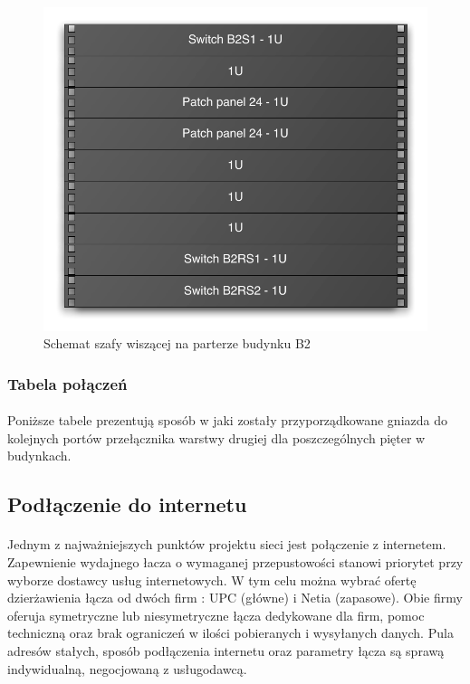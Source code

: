 \begin{figure}[H]
  \begin{center}
    \includegraphics[width=\textwidth]{img/s/szafa-b2.pdf}
    \caption{Schemat szafy wiszącej na parterze budynku B2}
  \end{center}
\end{figure}


\subsubsection{Tabela połączeń}
\paragraph{}
Poniższe tabele prezentują sposób w jaki zostały przyporządkowane gniazda do kolejnych portów przełącznika warstwy drugiej dla poszczególnych pięter w budynkach.


\subsection{Podłączenie do internetu}
\paragraph{}
Jednym z najważniejszych punktów projektu sieci jest połączenie z internetem. Zapewnienie wydajnego łacza o wymaganej przepustowości stanowi priorytet przy wyborze dostawcy usług internetowych. W tym celu można wybrać ofertę dzierżawienia łącza od dwóch firm : UPC (główne) i Netia (zapasowe). Obie firmy oferuja symetryczne lub niesymetryczne łącza dedykowane dla firm, pomoc techniczną oraz brak ograniczeń w ilości pobieranych i wysyłanych danych. Pula adresów stałych, sposób podłączenia internetu oraz parametry łącza są sprawą indywidualną, negocjowaną z usługodawcą.

